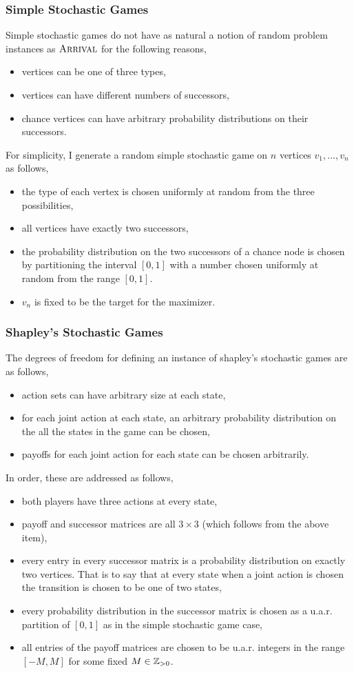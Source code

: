 \subsubsection{Simple Stochastic Games}
Simple stochastic games do not have as natural a notion of random problem instances as $\textsc{Arrival}$ for the following reasons,
\begin{itemize}
  \item vertices can be one of three types, 
  \item vertices can have different numbers of successors,
  \item chance vertices can have arbitrary probability distributions on their successors.
\end{itemize}
For simplicity, I generate a random simple stochastic game on $n$ vertices $v_1, ..., v_n$ as follows,
\begin{itemize}
  \item the type of each vertex is chosen uniformly at random from the three possibilities,
  \item all vertices have exactly two successors,
  \item the probability distribution on the two successors of a chance node is chosen by
    partitioning the interval $[0, 1]$ with a number chosen uniformly at random from the range $[0, 1]$.
  \item $v_n$ is fixed to be the target for the maximizer.
\end{itemize}

\subsubsection{Shapley's Stochastic Games}
The degrees of freedom for defining an instance of shapley's stochastic games are as follows,
\begin{itemize}
  \item action sets can have arbitrary size at each state,
  \item for each joint action at each state, an arbitrary probability distribution on the all
    the states in the game can be chosen,
  \item payoffs for each joint action for each state can be chosen arbitrarily.
\end{itemize}
In order, these are addressed as follows,
\begin{itemize}
  \item both players have three actions at every state,
  \item payoff and successor matrices are all $3 \times 3$ (which follows from the above item),
  \item every entry in every successor matrix is a probability distribution on exactly two vertices.
    That is to say that at every state when a joint action is chosen the transition is chosen
    to be one of two states,
  \item every probability distribution in the successor matrix is chosen as a u.a.r. partition of $[0, 1]$
    as in the simple stochastic game case,
  \item all entries of the payoff matrices are chosen to be u.a.r. integers in the range $[-M, M]$ for some
    fixed $M \in \mathbb{Z}_{> 0}$.
\end{itemize}
